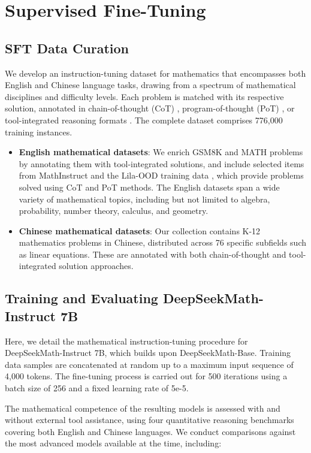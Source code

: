 \section{Supervised Fine-Tuning}

\subsection{SFT Data Curation}

We develop an instruction-tuning dataset for mathematics that encompasses both English and Chinese language tasks, drawing from a spectrum of mathematical disciplines and difficulty levels. Each problem is matched with its respective solution, annotated in chain-of-thought (CoT) \citep{cot}, program-of-thought (PoT) \citep{pot,pal}, or tool-integrated reasoning formats \citep{tora}. The complete dataset comprises 776,000 training instances.

\begin{itemize}[topsep=0pt]
    \item \textbf{English mathematical datasets}: We enrich GSM8K and MATH problems by annotating them with tool-integrated solutions, and include selected items from MathInstruct \citep{MathInstruct} and the Lila-OOD training data \citep{lila}, which provide problems solved using CoT and PoT methods. The English datasets span a wide variety of mathematical topics, including but not limited to algebra, probability, number theory, calculus, and geometry.
    \item \textbf{Chinese mathematical datasets}: Our collection contains K-12 mathematics problems in Chinese, distributed across 76 specific subfields such as linear equations. These are annotated with both chain-of-thought and tool-integrated solution approaches.
\end{itemize}

\subsection{Training and Evaluating DeepSeekMath-Instruct 7B}

Here, we detail the mathematical instruction-tuning procedure for DeepSeekMath-Instruct 7B, which builds upon DeepSeekMath-Base. Training data samples are concatenated at random up to a maximum input sequence of 4,000 tokens. The fine-tuning process is carried out for 500 iterations using a batch size of 256 and a fixed learning rate of 5e-5.

The mathematical competence of the resulting models is assessed with and without external tool assistance, using four quantitative reasoning benchmarks covering both English and Chinese languages. We conduct comparisons against the most advanced models available at the time, including:

